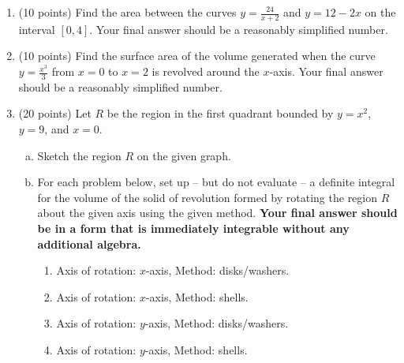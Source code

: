 \documentclass[12pt]{article}
\renewcommand{\emph}[1]{\textsf{\textbf{#1}}}
\begin{document}
\newpage
\begin{enumerate}
\item (10 points) Find the area between the curves {$\displaystyle{y=\frac{24}{x+2}}$} and {$\displaystyle{y=12-2x}$} on the interval $[0,4]$. Your final answer should be a reasonably simplified number. \\

\vfill


\item (10 points) Find the surface area of the volume generated when the curve $y=\frac{x^3}{3}$ from $x=0$ to $x=2$ is revolved around the $x$-axis. Your final answer should be a reasonably simplified number. \\

\vfill

\newpage

\item (20 points) Let $R$ be the region in the first quadrant bounded by $y=x^2$, $y=9$, and $x=0$. 
\begin{enumerate}[(a)]
	\item Sketch the region $R$ on the given graph.\\
	\begin{center}
        \end{center}
	
\item For each problem below, set up -- but do not evaluate -- a definite integral for the volume of the solid of revolution formed by rotating the region $R$ about the given axis using the given method. \emph{Your final answer should be in a form that is immediately integrable without any additional algebra.}
\begin{enumerate}
	\item Axis of rotation: $x$-axis, Method: disks/washers.\\
	\vfill
	\item Axis of rotation: $x$-axis, Method: shells.	\\
	\vfill
	\item Axis of rotation: $y$-axis, Method: disks/washers.	\\
	\vfill
	\item Axis of rotation: $y$-axis, Method: shells.	\\
	\vfill
	\end{enumerate}
\end{enumerate}


\end{enumerate}
\end{document}
